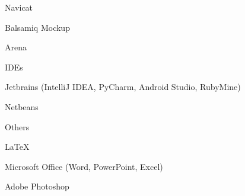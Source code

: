 \begin{cventries}
{\begin{cvitems}
                \item{Navicat}
                \item{Balsamiq Mockup}
                \item{Arena}
            \end{cvitems}
        }
    \cventry
        {}
        {IDEs}
        {}
        {}
        {
            \begin{cvitems}
                \item{Jetbrains (IntelliJ IDEA, PyCharm, Android Studio, RubyMine)}
                \item{Netbeans}
            \end{cvitems}
        }
    \cventry
        {}
        {Others}
        {}
        {}
        {
            \begin{cvitems}
                  \item{LaTeX}
                  \item{Microsoft Office (Word, PowerPoint, Excel)}
                  \item{Adobe Photoshop}
            \end{cvitems}
        }

\end{cventries}
